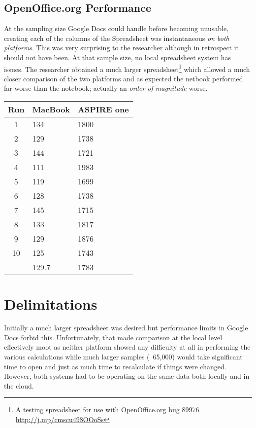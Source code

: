 \documentclass[12pt,oneside,letterpaper,titlepage]{article}
\begin{document}
\subsection{OpenOffice.org Performance}

At the sampling size Google Docs could handle before becoming unusable, creating
each of the columns of the Spreadsheet was instantaneous \emph{on both
  platforms}.  This was very surprising to the researcher although in retrospect
it should not have been.  At that sample size, no local spreadsheet system has
issues.  The researcher obtained a much larger spreadsheet\footnote{A testing
  spreadsheet for use with OpenOffice.org bug 89976
  \url{http://j.mp/cmscu498OOoSs}} which allowed a much closer comparison of the
two platforms and as expected the netbook performed far worse than the notebook;
actually an \emph{order of magnitude} worse.

\begin{tabular}{| c | l | l |}
  \hline
  Run  & MacBook & ASPIRE one \\ \hline
  1    & 134     & 1800       \\ \hline
  2    & 129     & 1738       \\ \hline
  3    & 144     & 1721       \\ \hline
  4    & 111     & 1983       \\ \hline
  5    & 119     & 1699       \\ \hline
  6    & 128     & 1738       \\ \hline
  7    & 145     & 1715       \\ \hline
  8    & 133     & 1817       \\ \hline
  9    & 129     & 1876       \\ \hline
  10   & 125     & 1743       \\ \hline
       & 129.7   & 1783       \\
  \hline
\end{tabular}

\section{Delimitations}


Initially a much larger spreadsheet was desired but performance limits in Google
Docs forbid this.  Unfortunately, that made comparison at the local level
effectively moot as neither platform showed any difficulty at all in performing
the various calculations while much larger samples (~65,000) would take
significant time to open and just as much time to recalculate if things were
changed.  However, both systems had to be operating on the same data both
locally and in the cloud.
\end{document}
